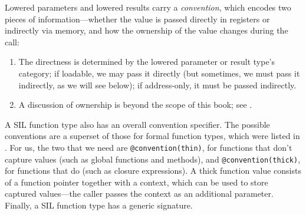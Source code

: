 \documentclass[../generics]{subfiles}
\begin{document}
Lowered parameters and lowered results carry a \emph{convention}, which encodes two pieces of information---whether the value is passed directly in registers or indirectly via memory, and how the ownership of the value changes during the call:
\begin{enumerate}
\item The directness is determined by the lowered parameter or result type's category; if loadable, we may pass it directly (but sometimes, we must pass it indirectly, as we will see below); if address-only, it must be passed indirectly.
\item A discussion of ownership is beyond the scope of this book; see \cite{silownership,siltypes}.
\end{enumerate}

A SIL function type also has an overall convention specifier. The possible conventions are a superset of those for formal function types, which were listed in . For us, the two that we need are \texttt{@convention(thin)}, for functions that don't capture values (such as global functions and methods), and \texttt{@convention(thick)}, for functions that do (such as closure expressions). A thick function value consists of a function pointer together with a context, which can be used to store captured values---the caller passes the context as an additional parameter. Finally, a SIL function type has a generic signature.
\end{document}
